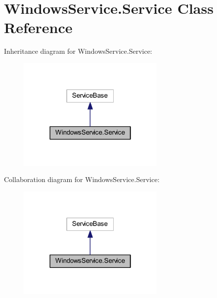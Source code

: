 \hypertarget{class_windows_service_1_1_service}{\section{Windows\-Service.\-Service Class Reference}
\label{class_windows_service_1_1_service}
}


Inheritance diagram for Windows\-Service.\-Service\-:\nopagebreak
\begin{figure}[H]
\begin{center}
\leavevmode
\includegraphics[width=202pt]{class_windows_service_1_1_service__inherit__graph}
\end{center}
\end{figure}


Collaboration diagram for Windows\-Service.\-Service\-:\nopagebreak
\begin{figure}[H]
\begin{center}
\leavevmode
\includegraphics[width=202pt]{class_windows_service_1_1_service__coll__graph}
\end{center}
\end{figure}
